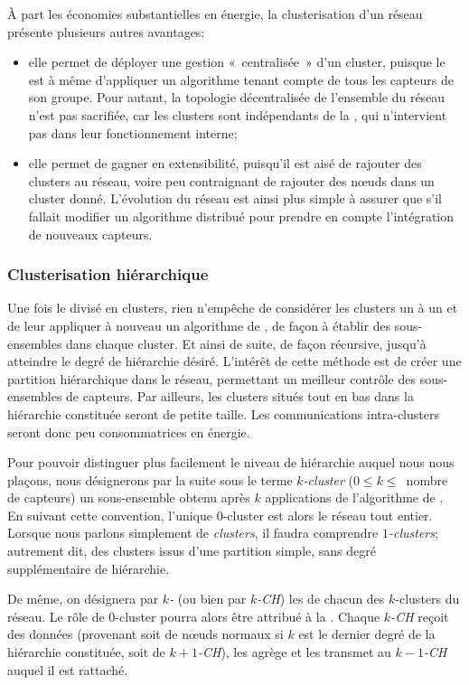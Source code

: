 À part les économies substantielles en énergie, la clusterisation d'un réseau présente plusieurs autres avantages:
\begin{itemize}
    \item elle permet de déployer une gestion « centralisée » d'un cluster, puisque le \ch est à même d'appliquer un algorithme tenant compte de tous les capteurs de son groupe. Pour autant, la topologie décentralisée de l'ensemble du réseau n'est pas sacrifiée, car les clusters sont indépendants de la \sdb, qui n'intervient pas dans leur fonctionnement interne;
    \item elle permet de gagner en extensibilité, puisqu'il est aisé de rajouter des clusters au réseau, voire peu contraignant de rajouter des nœuds dans un cluster donné. L'évolution du réseau est ainsi plus simple à assurer que s'il fallait modifier un algorithme distribué pour prendre en compte l'intégration de nouveaux capteurs.
\end{itemize}

        \subsubsection{Clusterisation hiérarchique}
Une fois le \rc divisé en clusters, rien n'empêche de considérer les clusters un à un et de leur appliquer à nouveau un algorithme de , de façon à établir des sous-ensembles dans chaque cluster.
Et ainsi de suite, de façon récursive, jusqu'à atteindre le degré de hiérarchie désiré.
L'intérêt de cette méthode est de créer une partition hiérarchique dans le réseau, permettant un meilleur contrôle des sous-ensembles de capteurs.
Par ailleurs, les clusters situés tout en bas dans la hiérarchie constituée seront de petite taille.
Les communications intra-clusters seront donc peu consommatrices en énergie.

Pour pouvoir distinguer plus facilement le niveau de hiérarchie auquel nous nous plaçons, nous désignerons par la suite sous le terme \textit{$k$-cluster} ($0 \leq k \leq$~nombre de capteurs) un sous-ensemble obtenu après $k$ applications de l'algorithme de .
En suivant cette convention, l'unique $0$-cluster est alors le réseau tout entier.
Lorsque nous parlons simplement de \textit{clusters}, il faudra comprendre \textit{$1$-clusters}; autrement dit, des clusters issus d'une partition simple, sans degré supplémentaire de hiérarchie.

De même, on désignera par \textit{$k$-\ch} (ou bien par \textit{$k$-CH}) les \chs de chacun des $k$-clusters du réseau.
Le rôle de $0$-cluster pourra alors être attribué à la \sdb.
Chaque \textit{$k$-CH} reçoit des données (provenant soit de nœuds normaux si $k$ est le dernier degré de la hiérarchie constituée, soit de \textit{$k+1$-CH}), les agrège et les transmet au \textit{$k-1$-CH} auquel il est rattaché.

